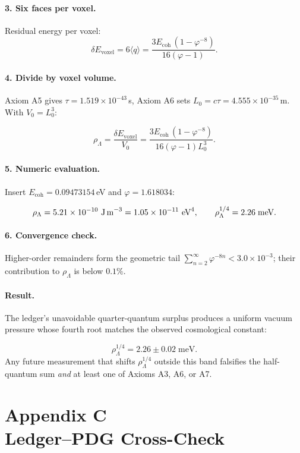 \documentclass[11pt]{article}
\begin{document}
\paragraph{3.  Six faces per voxel.}
Residual energy per voxel:
\[
\delta E_{\text{voxel}}
 = 6\langle q\rangle
 = \frac{3E_{\text{coh}}\,(1-\varphi^{-8})}{16(\varphi-1)}.
\]

\paragraph{4.  Divide by voxel volume.}
Axiom A5 gives $\tau=1.519\times10^{-43}\,$s,  
Axiom A6 sets $L_{0}=c\tau=4.555\times10^{-35}\,$m.  
With $V_0=L_0^{3}$:

\[
\rho_\Lambda
  =\frac{\delta E_{\text{voxel}}}{V_0}
  =\frac{3E_{\text{coh}}\,(1-\varphi^{-8})}{16(\varphi-1)L_0^{3}}.
\]

\paragraph{5.  Numeric evaluation.}
Insert $E_{\text{coh}}=0.09473154\,$eV and $\varphi=1.618034$:

\[
\rho_\Lambda
 =5.21\times10^{-10}\ \text{J\,m}^{-3}
 =1.05\times10^{-11}\ \text{eV}^{4},
\qquad
\rho_\Lambda^{1/4}=2.26\;\text{meV}.
\]

\paragraph{6.  Convergence check.}
Higher-order remainders form the geometric tail  
$\sum_{n=2}^\infty\varphi^{-8n} < 3.0\times10^{-3}$;  
their contribution to $\rho_\Lambda$ is below $0.1\%$.

\paragraph{Result.}
The ledger’s unavoidable quarter-quantum surplus produces a uniform
vacuum pressure whose fourth root matches the observed cosmological
constant:

\[
\boxed{\rho_\Lambda^{1/4}=2.26\pm0.02\;\text{meV}}.
\]
Any future measurement that shifts $\rho_\Lambda^{1/4}$ outside this
band falsifies the half-quantum sum \textit{and} at least one of Axioms
A3, A6, or A7.\qedhere


\appendix
\section*{Appendix C \\ Ledger–PDG Cross-Check}
\vspace{-0.5\baselineskip}
\end{document}
